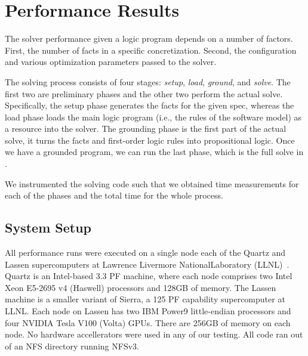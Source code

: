 \section{Performance Results}
\label{sec:perf-results}


The \clingo{} solver performance given a logic program depends on a number of factors. First, the number of facts in a specific concretization. Second, the configuration and various optimization parameters passed to the solver.

The solving process consists of four stages: \emph{setup}, \emph{load}, \emph{ground}, and \emph{solve}. The first two are preliminary phases and the other two perform the actual solve. Specifically, the setup phase generates the facts for the given spec, whereas the load phase loads the main logic program (i.e., the rules of the software model) as a resource into the solver. The grounding phase is the first part of the actual solve, it turns the facts and first-order logic rules into propositional logic. Once we have a grounded program, we can run the last phase, which is the full solve in \clingo{}.

We instrumented the solving code such that we obtained time measurements for each of the phases and the total time for the whole process.



% 

\subsection{System Setup}

All performance runs were executed on a single node each of the Quartz and Lassen supercomputers at Lawrence Livermore NationalLaboratory (LLNL)~\cite{llnl:hpc}. Quartz is an Intel-based 3.3 PF machine, where each node comprises two Intel Xeon E5-2695 v4 (Haswell) processors and 128GB of memory. The Lassen machine is a smaller variant of Sierra, a 125 PF capability supercomputer at LLNL. Each node on Lassen has two IBM Power9 little-endian processors and four NVIDIA Tesla V100 (Volta) GPUs. There are 256GB of memory on each node. No hardware accellerators were used in any of our testing. All code ran out of an NFS directory running NFSv3.

